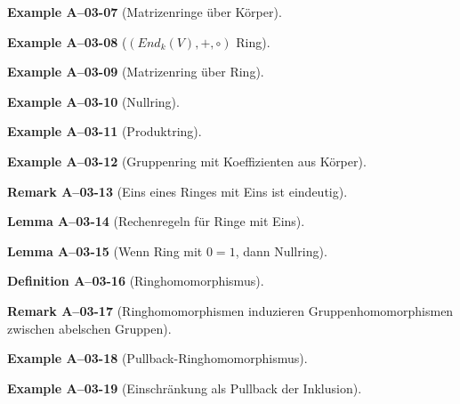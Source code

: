 \documentclass[10pt, letterpaper]{article}
\newcommand{\CustomHeading}[3]{%
  \par\medskip\noindent%
  \textbf{#1 #2} \textnormal{(#3)}.\enskip%
}
\newenvironment{DEF}[2]{\CustomHeading{Definition}{#1}{#2}}{}
\newenvironment{LEM}[2]{\CustomHeading{Lemma}{#1}{#2}}{}
\newenvironment{REM}[2]{\CustomHeading{Remark}{#1}{#2}}{}
\newenvironment{EXA}[2]{\CustomHeading{Example}{#1}{#2}}{}
\begin{document}
\begin{EXA}{A--03-07}{Matrizenringe über Körper}
\end{EXA}

\begin{EXA}{A--03-08}{$(End_k(V),+,\circ)$ Ring}
\end{EXA}

\begin{EXA}{A--03-09}{Matrizenring über Ring}
\end{EXA}

\begin{EXA}{A--03-10}{Nullring}
\end{EXA}

\begin{EXA}{A--03-11}{Produktring}
\end{EXA}

\begin{EXA}{A--03-12}{Gruppenring mit Koeffizienten aus Körper}
\end{EXA}

\begin{REM}{A--03-13}{Eins eines Ringes mit Eins ist eindeutig}
\end{REM}

\begin{LEM}{A--03-14}{Rechenregeln für Ringe mit Eins}
\end{LEM}

\begin{LEM}{A--03-15}{Wenn Ring mit $0=1$, dann Nullring}
\end{LEM}

\begin{DEF}{A--03-16}{Ringhomomorphismus}
\end{DEF}

\begin{REM}{A--03-17}{Ringhomomorphismen induzieren Gruppenhomomorphismen zwischen abelschen Gruppen}
\end{REM}

\begin{EXA}{A--03-18}{Pullback-Ringhomomorphismus}
\end{EXA}

\begin{EXA}{A--03-19}{Einschränkung als Pullback der Inklusion}
\end{EXA}
\end{document}
